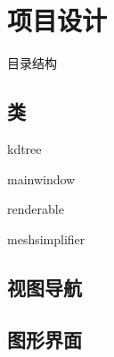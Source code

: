 
\section{项目设计}
目录结构

\subsection{类}
kdtree

mainwindow

renderable

meshsimplifier

\subsection{视图导航}

\subsection{图形界面}
